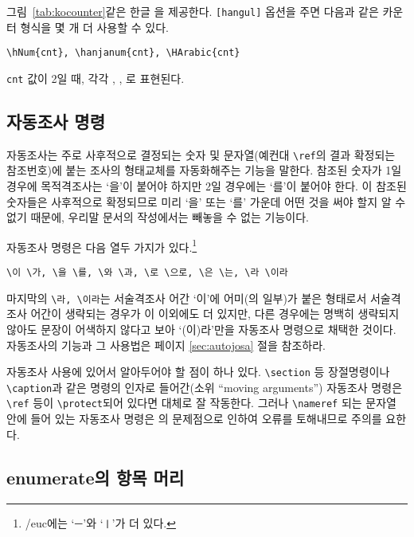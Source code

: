 그림~\ref{tab:kocounter}\과 같은 한글 을 제공한다.
\texttt{[hangul]} 옵션을 주면 다음과 같은 카운터 형식을 몇 개 더
사용할 수 있다. 
\begin{verbatim}
\hNum{cnt}, \hanjanum{cnt}, \HArabic{cnt}
\end{verbatim}
\verb|cnt| 값이 2일 때, 각각 , , 로 표현된다.

\subsection{자동조사 명령}

자동조사는 주로 사후적으로 결정되는 숫자 및 문자열(예컨대 \verb|\ref|의 
결과 확정되는 참조번호)에 붙는 조사의 형태교체를 자동화해주는 기능을
말한다. 참조된 숫자가 1일 경우에 목적격조사는 `을'이 붙어야 하지만
2일 경우에는 `를'이 붙어야 한다. 이 참조된 숫자들은 사후적으로 확정되므로
미리 `을' 또는 `를' 가운데 어떤 것을 써야 할지 알 수 없기 때문에,
우리말 문서의 작성에서는 빼놓을 수 없는 기능이다. 

자동조사 명령은 다음 열두 가지가 있다.\footnote{%
 \kotex/euc에는 `\texttt{\bs ㅡ}'와 `\texttt{\bs ㅣ}'가 더 있다.}
\begin{verbatim}
\이 \가, \을 \를, \와 \과, \로 \으로, \은 \는, \라 \이라
\end{verbatim}
마지막의 \verb|\라, \이라|는 서술격조사 어간 `이'에 어미(의 일부)가 붙은 형태로서
서술격조사 어간이 생략되는 경우가 이 이외에도 더 있지만, 다른 경우에는
명백히 생략되지 않아도 문장이 어색하지 않다고 보아 `(이)라'만을 자동조사
명령으로 채택한 것이다. 
자동조사의 기능과 그 사용법은 \pageref{sec:autojosa} 페이지 \ref{sec:autojosa} 절을 참조하라. 

자동조사 사용에 있어서 알아두어야 할 점이 하나 있다. \verb|\section| 등
장절명령이나 \verb|\caption|과 같은 명령의 인자로 들어간(소위 ``moving arguments'') 자동조사 명령은
\verb|\ref| 등이 \verb|\protect|되어 있다면 대체로 잘 작동한다.
그러나 \verb|\nameref| 되는 문자열 안에 들어 있는 자동조사 명령은
의 문제점으로 인하여 오류를 토해내므로 주의를 요한다.

\subsection{enumerate의 항목 머리}

